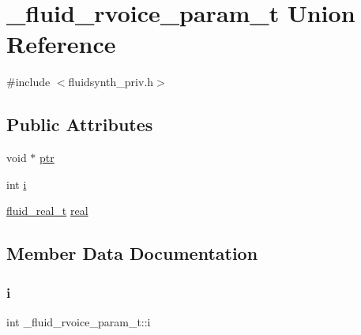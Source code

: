 \hypertarget{union__fluid__rvoice__param__t}{}\section{\+\_\+fluid\+\_\+rvoice\+\_\+param\+\_\+t Union Reference}
\label{union__fluid__rvoice__param__t}


{\ttfamily \#include $<$fluidsynth\+\_\+priv.\+h$>$}

\subsection*{Public Attributes}
\begin{DoxyCompactItemize}
\item 
void $\ast$ \hyperlink{union__fluid__rvoice__param__t_a52a3a904ce9b4cf050d9a50b7c421ce1}{ptr}
\item 
int \hyperlink{union__fluid__rvoice__param__t_a1f989db216e51ea83c102b4ebb0f2118}{i}
\item 
\hyperlink{fluidsynth__priv_8h_a9e96f0917747b69cabb7c671bc693dbb}{fluid\+\_\+real\+\_\+t} \hyperlink{union__fluid__rvoice__param__t_a37c385c55d50be836b0b7116a42b5c8f}{real}
\end{DoxyCompactItemize}


\subsection{Member Data Documentation}
\mbox{\label{union__fluid__rvoice__param__t_a1f989db216e51ea83c102b4ebb0f2118}} 
\subsubsection{\texorpdfstring{i}{i}}
{\footnotesize\ttfamily int \+\_\+fluid\+\_\+rvoice\+\_\+param\+\_\+t\+::i}

\mbox{\label{union__fluid__rvoice__param__t_a52a3a904ce9b4cf050d9a50b7c421ce1}} 
